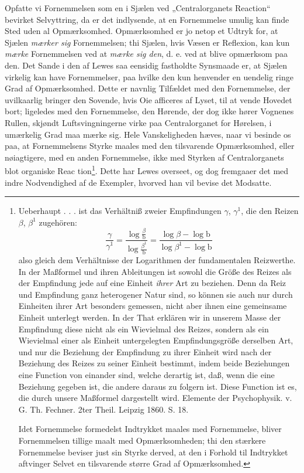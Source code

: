 \documentclass[11pt]{book}
\newcommand{\opage}[1]{\marginnote{\footnotesize\textit{[#1]}}}
\begin{document}
Opfatte vi Fornemmelsen som en i Sjælen ved „Centralorganets
Reaction“ bevirket Selvyttring, da er det indlysende, at en
Fornemmelse umulig kan finde Sted uden al Opmærksomhed.
Opmærksomhed er jo netop et Udtryk for, at Sjælen \emph{mærker sig}
Fornemmelsen; thi Sjælen, hvis Væsen er Reflexion, kan kun
\emph{mærke} Fornemmelsen ved at \emph{mærke sig den}, d. e. ved at
blive opmærksom paa den. Det Sande i den af Lewes saa eensidig
fastholdte Synsmaade er, at Sjælen virkelig kan have Fornemmelser,
paa hvilke den kun henvender en uendelig ringe Grad af
Opmærksomhed. Dette er navnlig Tilfældet med den Fornemmelse, der
uvilkaarlig bringer den Sovende, hvis Oie afficeres af Lyset, til at
vende Hovedet bort; ligeledes med den Fornemmelse, den Hørende, der
dog ikke hører Vognenes Rullen, skjøndt Luftsvingningerne virke paa
Centralorganet for Hørelsen, i umærkelig Grad maa mærke sig. Hele
Vanskeligheden hæves, naar vi besinde os paa, at Fornemmelsens Styrke
maales med den tilsvarende Opmærksomhed, eller nøiagtigere, med en
anden Fornemmelse, ikke med Styrken af Centralorganets blot organiske
Reac\-%
\opage{374} \setcounter{footnote}{0}%
tion\footnote{Ueberhaupt . . . ist das Verhältniß zweier Empfindungen
$\gamma$, $\gamma^{1}$, die den Reizen $\beta$, $\beta^{1}$ zugehören:
\[
  \frac{\gamma}{\gamma^{1}}
  = \frac{\log \frac{\beta}{\mathrm{b}}}{\log \frac{\beta^{1}}{\mathrm{b}}}
  = \frac{\log \beta - \log \mathrm{b}}{\log \beta^{1} - \log \mathrm{b}}
\]
also gleich dem Verhältnisse der Logarithmen der fundamentalen
Reizwerthe. In der Maßformel und ihren Ableitungen ist sowohl die
Größe des Reizes als der Empfindung jede auf eine Einheit
\emph{ihrer} Art zu beziehen. Denn da Reiz und Empfindung ganz
heterogener Natur sind, so können sie auch nur durch Einheiten ihrer
Art besonders gemessen, nicht aber ihnen eine gemeinsame Einheit
unterlegt werden. In der That erklären wir in unserem Masse der
Empfindung diese nicht als ein Wievielmal des Reizes, sondern als ein
Wievielmal einer als Einheit untergelegten Empfindungsgröße derselben
Art, und nur die Beziehung der Empfindung zu ihrer Einheit wird nach
der Beziehung des Reizes zu seiner Einheit bestimmt, indem beide
Beziehungen eine Function von einander sind, welche derartig ist,
daß, wenn die eine Beziehung gegeben ist, die andere daraus zu
folgern ist. Diese Function ist es, die durch unsere Maßformel
dargestellt wird. Elemente der Psychophysik. v. G. Th. Fechner. 2ter
Theil. Leipzig 1860. S. 18.\par
Idet Fornemmelse formedelst Indtrykket maales med Fornemmelse, bliver
Fornemmelsen tillige maalt med Opmærksomheden; thi den stærkere
Fornemmelse beviser just sin Styrke derved, at den i Forhold til
Indtrykket aftvinger Selvet en tilsvarende større Grad af
Opmærksomhed.}. Dette har Lewes overseet, og dog fremgaaer det med
indre Nodvendighed af de Exempler, hvorved han vil bevise det
Modsatte.
\end{document}
